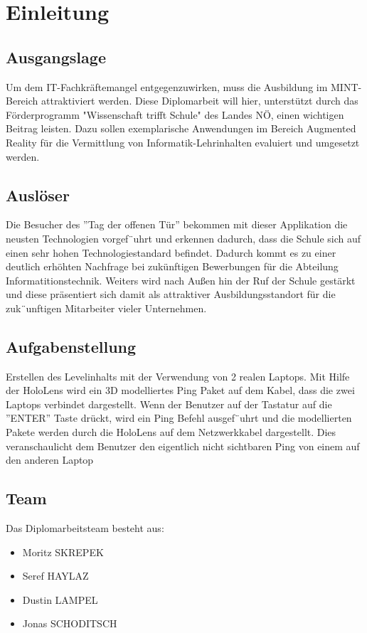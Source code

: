 \chapter{Einleitung}
\label{cha:Einleitung}

\section{Ausgangslage}
Um dem IT-Fachkräftemangel entgegenzuwirken, muss die Ausbildung im
MINT-Bereich attraktiviert werden. Diese Diplomarbeit will hier, unterstützt
durch das Förderprogramm "Wissenschaft trifft Schule" des Landes NÖ, einen
wichtigen Beitrag leisten. Dazu sollen exemplarische Anwendungen im Bereich
Augmented Reality für die Vermittlung von Informatik-Lehrinhalten evaluiert und
umgesetzt werden.

\section{Auslöser}
Die Besucher des ”Tag der offenen Tür” bekommen mit dieser Applikation die neusten
Technologien vorgef¨uhrt und erkennen dadurch, dass die Schule sich auf einen sehr hohen
Technologiestandard befindet. Dadurch kommt es zu einer deutlich erhöhten Nachfrage
bei zukünftigen Bewerbungen für die Abteilung Informatitionstechnik. Weiters wird nach
Außen hin der Ruf der Schule gestärkt und diese präsentiert sich damit als attraktiver
Ausbildungsstandort für die zuk¨unftigen Mitarbeiter vieler Unternehmen.

\section{Aufgabenstellung}
Erstellen des Levelinhalts mit der Verwendung von 2 realen Laptops. Mit
Hilfe der HoloLens wird ein 3D modelliertes Ping Paket auf dem Kabel, dass
die zwei Laptops verbindet dargestellt. Wenn der Benutzer auf der Tastatur auf
die ”ENTER” Taste drückt, wird ein Ping Befehl ausgef¨uhrt und die modellierten
Pakete werden durch die HoloLens auf dem Netzwerkkabel dargestellt. Dies veranschaulicht
dem Benutzer den eigentlich nicht sichtbaren Ping von einem auf den anderen Laptop

\section{Team}
Das Diplomarbeitsteam besteht aus:
\begin{itemize}
    \item Moritz SKREPEK
    \item Seref HAYLAZ
    \item Dustin LAMPEL
    \item Jonas SCHODITSCH
\end{itemize}


